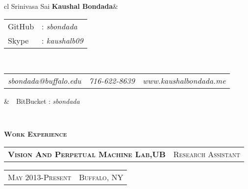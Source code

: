 \documentclass[10pt,letterpaper,oneside]{article}
\begin{document}
    \begin{center}
        \begin{tabular}{cl}
            {\Huge \textmd{Srinivasa Sai} \textbf{Kaushal Bondada}}&\begin{tabular}{ll}
                                                                        \textcolor{light-gray}{GitHub}&: \textit{sbondada}\\[0.1cm]
                                                                        \textcolor{light-gray}{Skype}&: \textit{kaushalb09}
                                                                    \end{tabular}\\[0.35cm]
            \begin{tabular}{c|c|c}
                \textit{sbondada@buffalo.edu}&\textit{716-622-8639}&\textit{www.kaushalbondada.me} 
            \end{tabular}                                          &\ \ \textcolor{light-gray}{BitBucket} : \textit{sbondada}
        \end{tabular}\\[0.6cm]
        \vspace{-10pt}
        \textcolor{light-gray}{\hrulefill} 
    \end{center} 
    \vspace{0pt}
    \vspace{0pt}
    \textcolor{light-gray}{\textbf{\large W\textsc{ork} E\textsc{xperience}}}
    \vspace{4pt}\\
    \begin{tabular}{c|c}
        \textbf{\normalsize V\textsc{ision} A\textsc{nd} P\textsc{erpetual} M\textsc{achine} L\textsc{ab},UB}
        &\textmd{\normalsize R\textsc{esearch} A\textsc{ssistant}}
    \end{tabular}
    \hspace{1.71in}
    \textcolor{light-gray}{
        \begin{tabular}{c|c}
            {\small M\textsc{ay 2013}-P\textsc{resent}}
           &{\small B\textsc{uffalo}, NY}
        \end{tabular}
    } 
    \vspace{-4mm}
\end{document}
